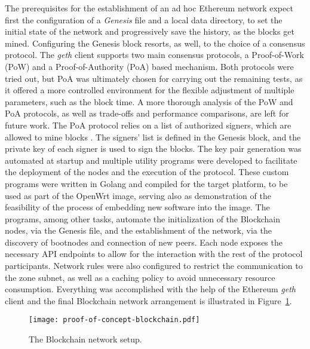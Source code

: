 The prerequisites for the establishment of an ad hoc Ethereum network expect first the configuration of a \emph{Genesis} file and a local data directory, to set the initial state of the network and progressively save the history, as the blocks get mined. Configuring the Genesis block resorts, as well, to the choice of a consensus protocol. The \emph{geth} client supports two main consensus protocols, a Proof-of-Work (PoW) and a Proof-of-Authority (PoA) based mechanism. Both protocols were tried out, but PoA was ultimately chosen for carrying out the remaining tests, as it offered a more controlled environment for the flexible adjustment of multiple parameters, such as the block time. A more thorough analysis of the PoW and PoA protocols, as well as trade-offs and performance comparisons, are left for future work. The PoA protocol relies on a list of authorized signers, which are allowed to mine blocks \cite{clique-eth}. The signers' list is defined in the Genesis block, and the private key of each signer is used to sign the blocks. The key pair generation was automated at startup and multiple utility programs were developed to facilitate the deployment of the nodes and the execution of the protocol. These custom programs were written in Golang and compiled for the target platform, to be used as part of the OpenWrt image, serving also as demonstration of the feasibility of the process of embedding new software into the image. The programs, among other tasks, automate the initialization of the Blockchain nodes, via the Genesis file, and the establishment of the network, via the discovery of bootnodes and connection of new peers. Each node exposes the necessary API endpoints to allow for the interaction with the rest of the protocol participants. Network rules were also configured to restrict the communication to the zone subnet, as well as a caching policy to avoid unnecessary resource consumption. Everything was accomplished with the help of the Ethereum \emph{geth} client and the final Blockchain network arrangement is illustrated in Figure~\ref{fig:pol-implementation:blockchain-network}.

\begin{figure}[h!]
    \begin{center}
    \texttt{[image: proof-of-concept-blockchain.pdf]}
    \caption{The Blockchain network setup.}
    \label{fig:pol-implementation:blockchain-network}
    \end{center}
\end{figure}

